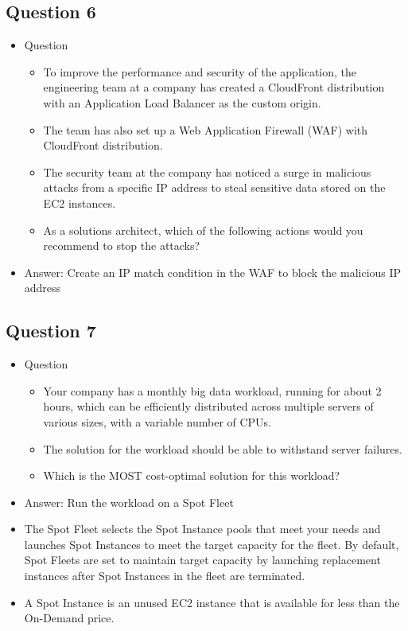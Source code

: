 \documentclass[]{scrartcl}
\begin{document}
\subsection{Question 6}
\begin{itemize}
	\item Question
	\begin{itemize}
		\item To improve the performance and security of the application, the engineering team at a company has created a CloudFront distribution with an Application Load Balancer as the custom origin. 
		\item The team has also set up a Web Application Firewall (WAF) with CloudFront distribution. 
		\item The security team at the company has noticed a surge in malicious attacks from a specific IP address to steal sensitive data stored on the EC2 instances.
		\item As a solutions architect, which of the following actions would you recommend to stop the attacks?
	\end{itemize}
	\item Answer: Create an IP match condition in the WAF to block the malicious IP address
\end{itemize}

\subsection{Question 7}
\begin{itemize}
	\item Question
	\begin{itemize}
		\item Your company has a monthly big data workload, running for about 2 hours, which can be efficiently distributed across multiple servers of various sizes, with a variable number of CPUs. 
		\item The solution for the workload should be able to withstand server failures.
		\item Which is the MOST cost-optimal solution for this workload?
	\end{itemize}
	\item Answer: Run the workload on a Spot Fleet
	\item The Spot Fleet selects the Spot Instance pools that meet your needs and launches Spot Instances to meet the target capacity for the fleet. By default, Spot Fleets are set to maintain target capacity by launching replacement instances after Spot Instances in the fleet are terminated.
	\item A Spot Instance is an unused EC2 instance that is available for less than the On-Demand price. 
\end{itemize}
\end{document}
